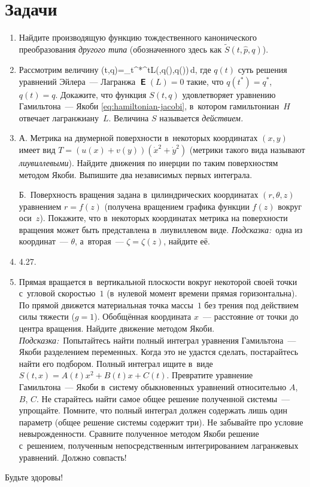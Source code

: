 \documentclass[a4paper,11pt]{article}
\def\[#1\]{\begin{align*}#1\end{align*}}
\theoremstyle{definition}
\begin{document}
\section{Задачи}

\begin{enumerate}

\item
Найдите производящую функцию тождественного канонического преобразования
\emph{другого типа} (обозначенного здесь как $\tilde S(t,\hat p,q)$).

\item
Рассмотрим величину
	\[
	S(t,q)=\int_{t^*}^tL(\theta,q(\theta),\dot q(\theta))\,d\theta,
	\]
где $q(t)$ суть решения уравнений Эйлера~— Лагранжа $\mbfsansE(L)=0$ такие, что
$q(t^*)=q^*$, $q(t)=q$. Докажите, что функция $S(t,q)$ удовлетворяет уравнению
Гамильтона~— Якоби \eqref{eq:hamiltonian-jacobi}, в~котором гамильтониан~$H$
отвечает лагранжиану~$L$. Величина $S$ называется \emph{действием.}

\item\label{prb:2}
А. Метрика на двумерной поверхности в~некоторых координатах $(x,y)$ имеет вид
$T=(u(x)+v(y))(\dot x^2+\dot y^2)$ (метрики такого вида называют
\emph{лиувиллевыми}). Найдите движения по инерции по таким поверхностям методом
Якоби. Выпишите два независимых первых интеграла.

Б.~Поверхность вращения задана в~цилиндрических координатах $(r,\theta,z)$
уравнением $r=f(z)$ (получена вращением графика функции $f(z)$ вокруг оси~$z$).
Покажите, что в~некоторых координатах метрика на поверхности вращения может
быть представлена в~лиувиллевом виде. \emph{Подсказка:\/}~одна из
координат~— $\theta$, а~вторая~— $\zeta=\zeta(z)$, найдите её.

\item\label{prb:3}
4.27.

\item
Прямая вращается в~вертикальной плоскости вокруг некоторой своей точки
с~угловой скоростью~$1$ (в~нулевой момент времени прямая горизонтальна). По
прямой движется материальная точка массы~$1$ без трения под действием силы
тяжести ($g=1$). Обобщённая координата $x$~— расстояние от точки до центра
вращения. Найдите движение методом Якоби. \emph{Подсказка:\/}~Попытайтесь найти
полный интеграл уравнения Гамильтона~— Якоби разделением переменных. Когда это
не удастся сделать, постарайтесь найти его подбором. Полный интеграл ищите
в~виде $S(t,x)=A(t)x^2+B(t)x+C(t)$. Превратите уравнение Гамильтона~— Якоби
в~систему обыкновенных уравнений относительно $A$, $B$, $C$. Не старайтесь
найти самое общее решение полученной системы~— упрощайте. Помните, что полный
интеграл должен содержать лишь один параметр (общее решение системы содержит
три). Не забывайте про условие невырожденности. Сравните полученное методом
Якоби решение с~решением, полученным непосредственным интегрированием
лагранжевых уравнений. Должно совпасть!


\end{enumerate}

Будьте здоровы!
\end{document}

